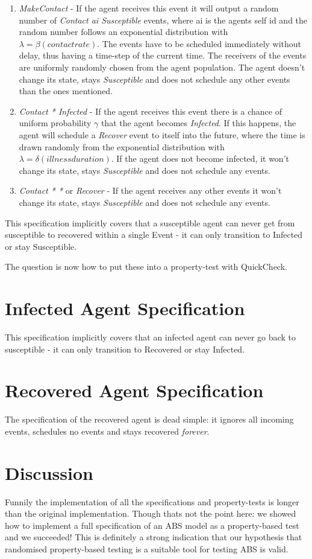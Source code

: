 \begin{enumerate}
	\item \textit{MakeContact} - If the agent receives this event it will output a random number of \textit{Contact ai Susceptible} events, where ai is the agents self id and the random number follows an exponential distribution with $\lambda = \beta (contact rate)$. The events have to be scheduled immediately without delay, thus having a time-step of the current time. The receivers of the events are uniformly randomly chosen from the agent population. The agent doesn't change its state, stays \textit{Susceptible} and does not schedule any other events than the ones mentioned.
	
	\item \textit{Contact * Infected} - If the agent receives this event there is a chance of uniform probability $\gamma$ that the agent becomes \textit{Infected}. If this happens, the agent will schedule a \textit{Recover} event to itself into the future, where the time is drawn randomly from the exponential distribution with $\lambda = \delta (illness duration)$. If the agent does not become infected, it won't change its state, stays \textit{Susceptible} and does not schedule any events.
	
	\item \textit{Contact * *} or \textit{Recover}  - If the agent receives any other events it won't change its state, stays \textit{Susceptible} and does not schedule any events.
\end{enumerate}

This specification implicitly covers that a susceptible agent can never get from susceptible to recovered within a single Event - it can only transition to Infected or stay Susceptible.

The question is now how to put these into a property-test with QuickCheck.

\section{Infected Agent Specification}

This specification implicitly covers that an infected agent can never go back to susceptible - it can only transition to Recovered or stay Infected.

\section{Recovered Agent Specification}
The specification of the recovered agent is dead simple: it ignores all incoming events, schedules no events and stays recovered \textit{forever}.  

\section{Discussion}
Funnily the implementation of all the specifications and property-tests is longer than the original implementation. Though thats not the point here: we showed how to implement a full specification of an ABS model as a property-based test and we succeeded! This is definitely a strong indication that our hypothesis that randomised property-based testing is a suitable tool for testing ABS is valid.